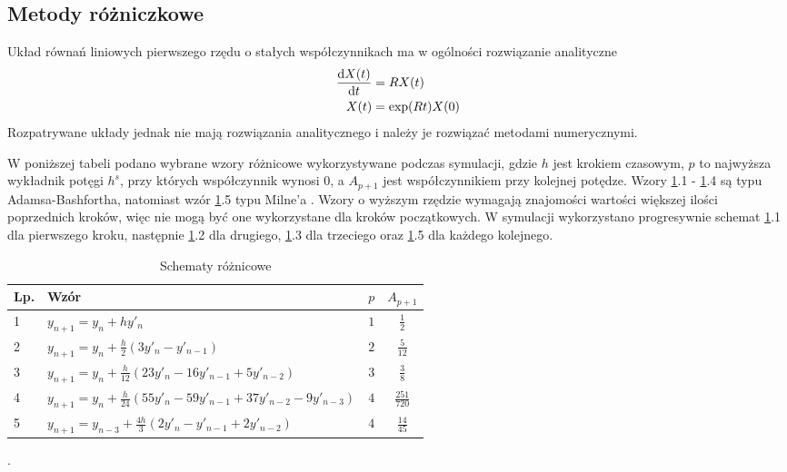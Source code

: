 \documentclass[10pt, a4paper, twoside, onecolumn]{article}
\numberwithin{equation}{section}
\begin{document}
	\subsection{Metody różniczkowe}
	Układ równań liniowych pierwszego rzędu o stałych współczynnikach ma w ogólności rozwiązanie analityczne \cite{palczewski}
	\begin{equation}
	\begin{split}
		\dv{X(t)}{t} &= RX(t) \\
		X(t) &= \exp(Rt)X(0)
	\end{split}
	\end{equation}
	Rozpatrywane układy jednak nie mają rozwiązania analitycznego i należy je rozwiązać metodami numerycznymi. \par
	W poniższej tabeli podano wybrane wzory różnicowe wykorzystywane podczas symulacji, gdzie \(h\) jest krokiem czasowym, \(p\) to najwyższa wykładnik potęgi \(h^{s}\), przy których współczynnik wynosi \(0\), a \(A_{p+1}\) jest współczynnikiem przy kolejnej potędze. Wzory \ref{tab:schematy}.1 - \ref{tab:schematy}.4 są typu Adamsa-Bashfortha, natomiast wzór \ref{tab:schematy}.5 typu Milne'a \cite{fortuna}. Wzory o wyższym rzędzie wymagają znajomości wartości większej ilości poprzednich kroków, więc nie mogą być one wykorzystane dla kroków początkowych. W symulacji wykorzystano progresywnie schemat \ref{tab:schematy}.1 dla pierwszego kroku, następnie \ref{tab:schematy}.2 dla drugiego, \ref{tab:schematy}.3 dla trzeciego oraz \ref{tab:schematy}.5 dla każdego kolejnego. 
	\begin{table}[H]
		\centering
		\begin{tabular}{|l|l|c|c|}
			\hline
			Lp. & Wzór & \(p\) & \(A_{p+1}\) \\
			\hline
			1 & \(y_{n+1}=y_{n}+hy'_{n}\) & \(1\) & \(\frac{1}{2}\) \\
			\hline
			2 & \(y_{n+1}=y_{n}+\frac{h}{2}(3y'_{n}-y'_{n-1})\) & \(2\) & \(\frac{5}{12}\) \\
			\hline
			3 & \(y_{n+1}=y_{n}+\frac{h}{12}(23y'_{n}-16y'_{n-1}+5y'_{n-2})\) & \(3\) & \(\frac{3}{8}\) \\
			\hline
			4 & \(y_{n+1}=y_{n}+\frac{h}{24}(55y'_{n}-59y'_{n-1}+37y'_{n-2}-9y'_{n-3})\) & \(4\) & \(\frac{251}{720}\) \\
			\hline
			5 & \(y_{n+1}=y_{n-3}+\frac{4h}{3}(2y'_{n}-y'_{n-1}+2y'_{n-2})\) & \(4\) & \(\frac{14}{45}\) \\
			\hline
		\end{tabular}.
		\caption{Schematy różnicowe}
		\label{tab:schematy}
	\end{table}
	
\end{document}

